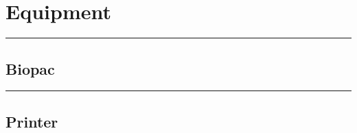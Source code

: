 \documentclass[]{book}
\begin{document}
\hypertarget{equipment}{%
\section{Equipment}\label{equipment}}

\begin{center}\rule{0.5\linewidth}{0.5pt}\end{center}

\hypertarget{biopac}{%
\subsection{Biopac}\label{biopac}}

\begin{center}\rule{0.5\linewidth}{0.5pt}\end{center}

\hypertarget{printer}{%
\subsection{Printer}\label{printer}}
\end{document}
